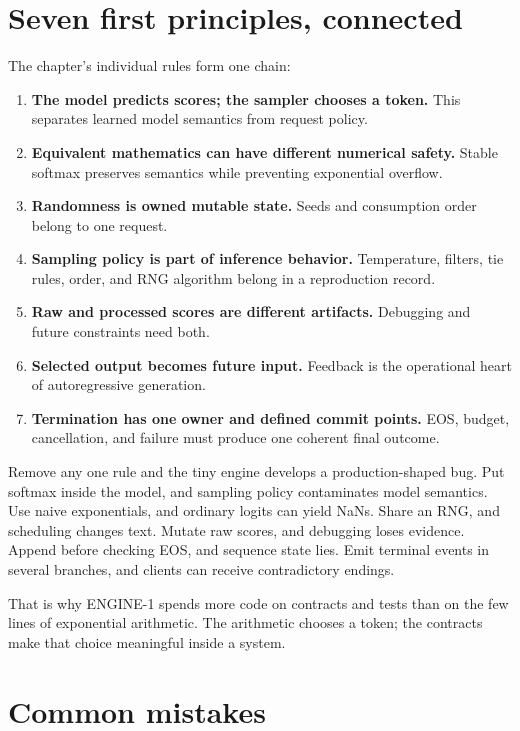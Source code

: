 \section{Seven first principles,
connected}\label{seven-first-principles-connected}

The chapter's individual rules form one chain:

\begin{enumerate}
\def\labelenumi{\arabic{enumi}.}
\tightlist
\item
  \textbf{The model predicts scores; the sampler chooses a token.} This
  separates learned model semantics from request policy.
\item
  \textbf{Equivalent mathematics can have different numerical safety.}
  Stable softmax preserves semantics while preventing exponential
  overflow.
\item
  \textbf{Randomness is owned mutable state.} Seeds and consumption
  order belong to one request.
\item
  \textbf{Sampling policy is part of inference behavior.} Temperature,
  filters, tie rules, order, and RNG algorithm belong in a reproduction
  record.
\item
  \textbf{Raw and processed scores are different artifacts.} Debugging
  and future constraints need both.
\item
  \textbf{Selected output becomes future input.} Feedback is the
  operational heart of autoregressive generation.
\item
  \textbf{Termination has one owner and defined commit points.} EOS,
  budget, cancellation, and failure must produce one coherent final
  outcome.
\end{enumerate}

Remove any one rule and the tiny engine develops a production-shaped
bug. Put softmax inside the model, and sampling policy contaminates
model semantics. Use naive exponentials, and ordinary logits can yield
NaNs. Share an RNG, and scheduling changes text. Mutate raw scores, and
debugging loses evidence. Append before checking EOS, and sequence state
lies. Emit terminal events in several branches, and clients can receive
contradictory endings.

That is why ENGINE-1 spends more code on contracts and tests than on the
few lines of exponential arithmetic. The arithmetic chooses a token; the
contracts make that choice meaningful inside a system.

\section{Common mistakes}\label{common-mistakes-3}

